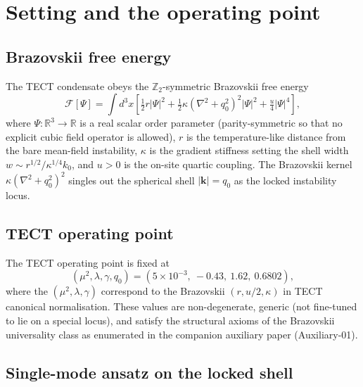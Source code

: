 \section{Setting and the operating point}\label{sec:setting}

\subsection{Brazovskii free energy}

The TECT condensate obeys the $\mathbb{Z}_2$-symmetric Brazovskii free
energy
\begin{equation}
\mathcal{F}[\Psi] = \int d^3x \left[
\tfrac{1}{2} r |\Psi|^2 + \tfrac{1}{2} \kappa
(\nabla^2 + q_0^2)^2 |\Psi|^2 + \tfrac{u}{4} |\Psi|^4
\right],
\label{eq:F}
\end{equation}
where $\Psi : \mathbb{R}^3 \to \mathbb{R}$ is a real scalar order
parameter (parity-symmetric so that no explicit cubic field operator is
allowed), $r$ is the temperature-like distance from the bare
mean-field instability, $\kappa$ is the gradient stiffness setting the
shell width $w \sim r^{1/2}/\kappa^{1/4} k_0$, and $u > 0$ is the
on-site quartic coupling. The Brazovskii kernel
$\kappa(\nabla^2 + q_0^2)^2$ singles out the spherical shell
$|\mathbf{k}| = q_0$ as the locked instability locus.

\subsection{TECT operating point}

The TECT operating point is fixed at
\begin{equation}
(\mu^2, \lambda, \gamma, q_0) =
(5 \times 10^{-3},\ -0.43,\ 1.62,\ 0.6802),
\end{equation}
where the $(\mu^2,\lambda,\gamma)$ correspond to the Brazovskii
$(r,u/2,\kappa)$ in TECT canonical normalisation. These values are
non-degenerate, generic (not fine-tuned to lie on a special locus),
and satisfy the structural axioms of the Brazovskii universality
class as enumerated in the companion auxiliary paper
(Auxiliary-01).

\subsection{Single-mode ansatz on the locked shell}

